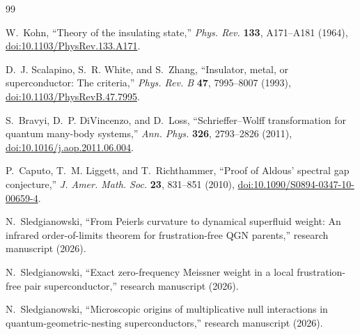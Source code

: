 \documentclass[11pt]{article}
\theoremstyle{definition}
\theoremstyle{remark}
\begin{document}
\begin{thebibliography}{99}

W.~Kohn,
``Theory of the insulating state,''
\emph{Phys. Rev.} \textbf{133}, A171--A181 (1964),
\href{https://doi.org/10.1103/PhysRev.133.A171}{doi:10.1103/PhysRev.133.A171}.

D.~J. Scalapino, S.~R. White, and S.~Zhang,
``Insulator, metal, or superconductor: The criteria,''
\emph{Phys. Rev. B} \textbf{47}, 7995--8007 (1993),
\href{https://doi.org/10.1103/PhysRevB.47.7995}{doi:10.1103/PhysRevB.47.7995}.

S.~Bravyi, D.~P. DiVincenzo, and D.~Loss,
``Schrieffer--Wolff transformation for quantum many-body systems,''
\emph{Ann. Phys.} \textbf{326}, 2793--2826 (2011),
\href{https://doi.org/10.1016/j.aop.2011.06.004}{doi:10.1016/j.aop.2011.06.004}.

P.~Caputo, T.~M. Liggett, and T.~Richthammer,
``Proof of Aldous' spectral gap conjecture,''
\emph{J. Amer. Math. Soc.} \textbf{23}, 831--851 (2010),
\href{https://doi.org/10.1090/S0894-0347-10-00659-4}{doi:10.1090/S0894-0347-10-00659-4}.

N.~Sledgianowski,
``From Peierls curvature to dynamical superfluid weight: An infrared
order-of-limits theorem for frustration-free QGN parents,''
research manuscript (2026).

N.~Sledgianowski,
``Exact zero-frequency Meissner weight in a local frustration-free pair
superconductor,'' research manuscript (2026).

N.~Sledgianowski,
``Microscopic origins of multiplicative null interactions in
quantum-geometric-nesting superconductors,'' research manuscript (2026).

\end{thebibliography}
\end{document}
